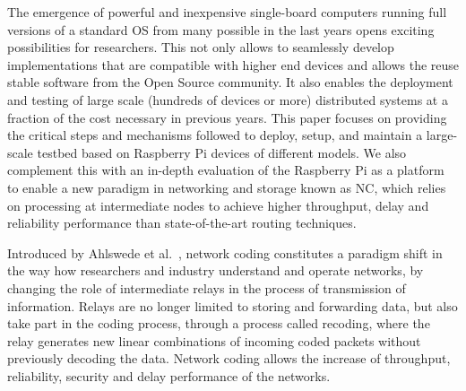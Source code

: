 %

The emergence of powerful and inexpensive single-board computers
running full versions of a standard \ac{OS} from many possible in the last
years opens exciting possibilities for researchers. This not only
allows to seamlessly develop implementations that are compatible with
higher end devices and allows the reuse stable software from the Open
Source community. It also enables the deployment and testing of large
scale (hundreds of devices or more) distributed systems at a fraction
of the cost necessary in previous years. This paper focuses on
providing the critical steps and mechanisms followed to deploy, setup,
and maintain a large-scale testbed based on Raspberry Pi devices of
different models. We also complement this with an in-depth evaluation
of the Raspberry Pi as a platform to enable a new paradigm in
networking and storage known as \ac{NC}, which relies on
processing at intermediate nodes to achieve higher throughput, delay
and reliability performance than state-of-the-art routing techniques.


Introduced by Ahlswede et al.~\cite{ahlswede2000network}, network
coding constitutes a paradigm shift in the way how researchers and
industry understand and operate networks, by changing the role of
intermediate relays in the process of transmission of information.
Relays are no longer limited to storing and forwarding data, but also
take part in the coding process, through a process called recoding,
where the relay generates new linear combinations of incoming coded
packets without previously decoding the data. Network coding allows
the increase of throughput, reliability, security and delay
performance of the networks.

